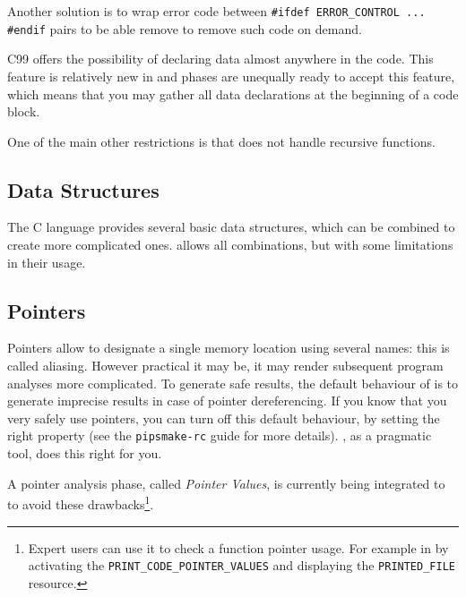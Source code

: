 \documentclass[a4paper]{article}
\begin{document}
Another solution is to wrap error code between %
\lstinline|#ifdef ERROR_CONTROL ... #endif| pairs to be able remove to
remove such code on demand.

C99 offers the possibility of declaring data almost anywhere in the
code. This feature is relatively new in \Apips and phases are unequally
ready to accept this feature, which means that you may gather all data
declarations at the beginning of a code block.

One of the main other restrictions is that \Apips does not handle
recursive functions.


\subsection{Data Structures}
\label{sec:data_structures}

The C language provides several basic data structures, which can be
combined to create more complicated ones. \Apips allows all combinations,
but with some limitations in their usage.


\subsection{Pointers}
\label{sec:pointers}

Pointers allow to designate a single memory location using several names:
this is called aliasing. However practical it may be, it may render
subsequent program analyses more complicated. To generate safe results,
the default behaviour of \Apips is to generate imprecise results in case
of pointer dereferencing. If you know that you very safely use
pointers, you can turn off this default behaviour, by setting the right
property (see the \texttt{pipsmake-rc} guide for more details). \Apfa, as
a pragmatic tool, does this right for you.

A pointer analysis phase, called \emph{Pointer Values}, is currently being
integrated to \Apips to avoid these drawbacks\footnote{Expert users can
  use it to check a function pointer usage. For example in \Apips by
  activating the \texttt{PRINT\_CODE\_POINTER\_VALUES} and displaying the
  \texttt{PRINTED\_FILE} resource.}.
\end{document}
